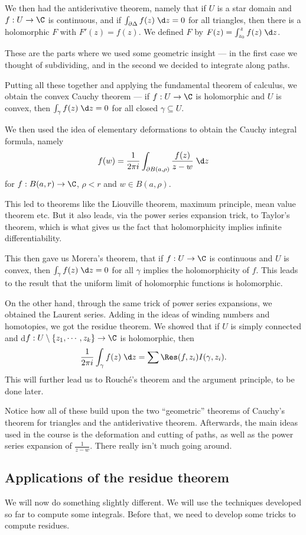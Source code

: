 \documentclass[a4paper]{article}
\begin{document}
We then had the antiderivative theorem, namely that if $U$ is a star domain and $f: U \to \C$ is continuous, and if $\int_{\partial \Delta} f(z)\;\d z = 0$ for all triangles, then there is a holomorphic $F$ with $F'(z) = f(z)$. We defined $F$ by $F(z) = \int_{z_0}^z f(z)\;\d z$.

These are the parts where we used some geometric insight --- in the first case we thought of subdividing, and in the second we decided to integrate along paths.

Putting all these together and applying the fundamental theorem of calculus, we obtain the convex Cauchy theorem --- if $f: U \to \C$ is holomorphic and $U$ is convex, then $\int_\gamma f(z)\;\d z = 0$ for all closed $\gamma \subseteq U$.

We then used the idea of elementary deformations to obtain the Cauchy integral formula, namely
\[
  f(w) = \frac{1}{2\pi i} \int_{\partial B(a, \rho)} \frac{f(z)}{z - w}\;\d z
\]
for $f: B(a, r) \to \C$, $\rho < r$ and $w \in B(a, \rho)$.

This led to theorems like the Liouville theorem, maximum principle, mean value theorem etc. But it also leads, via the power series expansion trick, to Taylor's theorem, which is what gives us the fact that holomorphicity implies infinite differentiability.

This then gave us Morera's theorem, that if $f: U \to \C$ is continuous and $U$ is convex, then $\int_\gamma f(z)\;\d z = 0$ for all $\gamma$ implies the holomorphicity of $f$. This leads to the result that the uniform limit of holomorphic functions is holomorphic.

On the other hand, through the same trick of power series expansions, we obtained the Laurent series. Adding in the ideas of winding numbers and homotopies, we got the residue theorem. We showed that if $U$ is simply connected and d$f: U \setminus \{z_1, \cdots, z_k\} \to \C$ is holomorphic, then
\[
  \frac{1}{2\pi i} \int_{\gamma} f(z)\;\d z = \sum \Res(f, z_i) I(\gamma, z_i).
\]
This will further lead us to Rouch\'e's theorem and the argument principle, to be done later.

Notice how all of these build upon the two ``geometric'' theorems of Cauchy's theorem for triangles and the antiderivative theorem. Afterwards, the main ideas used in the course is the deformation and cutting of paths, as well as the power series expansion of $\frac{1}{z - w}$. There really isn't much going around.

\subsection{Applications of the residue theorem}
We will now do something slightly different. We will use the techniques developed so far to compute some integrals. Before that, we need to develop some tricks to compute residues.
\end{document}
